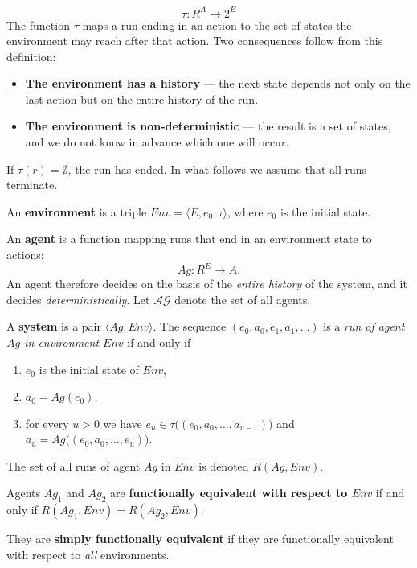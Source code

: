 \documentclass[11pt,a4paper]{article}
\theoremstyle{definition}
\begin{document}
\begin{defbox}
\[
\tau : R^A \to 2^E
\]
The function $\tau$ maps a run ending in an action to the set of states the environment may reach
after that action. Two consequences follow from this definition:
\begin{itemize}
\item \textbf{The environment has a history} --- the next state depends not only on the last
  action but on the entire history of the run.
\item \textbf{The environment is non-deterministic} --- the result is a set of states, and we do
  not know in advance which one will occur.
\end{itemize}
If $\tau(r) = \emptyset$, the run has ended. In what follows we assume that all runs terminate.

An \textbf{environment} is a triple $\mathit{Env} = \langle E, e_0, \tau\rangle$, where $e_0$ is
the initial state.
\end{defbox}

\begin{defbox}
An \textbf{agent} is a function mapping runs that end in an environment state to actions:
\[
Ag : R^E \to A .
\]
An agent therefore decides on the basis of the \emph{entire history} of the system, and it decides
\emph{deterministically}. Let $\mathcal{AG}$ denote the set of all agents.

A \textbf{system} is a pair $\langle Ag, \mathit{Env}\rangle$. The sequence
$(e_0, a_0, e_1, a_1, \dots)$ is a \emph{run of agent $Ag$ in environment $\mathit{Env}$} if and
only if
\begin{enumerate}
\item $e_0$ is the initial state of $\mathit{Env}$,
\item $a_0 = Ag(e_0)$,
\item for every $u > 0$ we have $e_u \in \tau\big((e_0,a_0,\dots,a_{u-1})\big)$
  and $a_u = Ag\big((e_0,a_0,\dots,e_u)\big)$.
\end{enumerate}
The set of all runs of agent $Ag$ in $\mathit{Env}$ is denoted $R(Ag,\mathit{Env})$.
\end{defbox}

\begin{defbox}
Agents $Ag_1$ and $Ag_2$ are \textbf{functionally equivalent with respect to $\mathit{Env}$} if
and only if $R(Ag_1,\mathit{Env}) = R(Ag_2,\mathit{Env})$.

They are \textbf{simply functionally equivalent} if they are functionally equivalent with respect
to \emph{all} environments.
\end{defbox}
\end{document}
